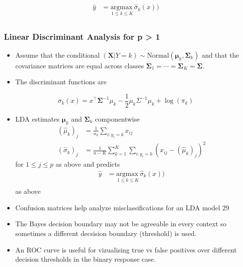 \documentclass[11pt]{article}
\begin{document}
\begin{align*}
\hat{y} &= \underset{1 \leqslant k \leqslant K}{\text{argmax}\ } \hat{\sigma}_k(x)) \\
\end{align*}

    \hypertarget{linear-discriminant-analysis-for-p-1}{%
\subsubsection{Linear Discriminant Analysis for p \textgreater{}
1}\label{linear-discriminant-analysis-for-p-1}}

    \begin{itemize}
\item
  Assume that the conditional
  \((\mathbf{X}| Y = k) \sim \text{Normal}(\boldsymbol{\mu}_k, \boldsymbol{\Sigma}_k)\)
  and that the covariance matrices are equal across classes
  \(\boldsymbol{\Sigma}_1 = \cdots = \boldsymbol{\Sigma}_K = \boldsymbol{\Sigma}\).
\item
  The discriminant functions are
\end{itemize}

\[\sigma_k(x) = x^\top\boldsymbol{\Sigma}^{-1}\mu_k - \frac{1}{2}\mu_k {\Sigma}^{-1} \mu_k + \log(\pi_k)\]

\begin{itemize}
\item
  LDA estimates \(\boldsymbol{\mu}_k\) and \(\boldsymbol{\Sigma}_k\)
  componentwise \begin{align*}
  (\hat{\mu}_k)_j &= \frac{1}{n_k}\sum_{i: y_i = k} x_{ij}\\
  (\hat{\sigma}_k)_j &= \frac{1}{n-K} \sum_{k = 1}^K \sum_{i: y_i = k} \left(x_{ij} - (\hat{\mu}_k)_j\right)^2
  \end{align*} for \(1 \leqslant j \leqslant p\) as above and predicts
  \begin{align*}
  \hat{y} &= \underset{1 \leqslant k \leqslant K}{\text{argmax}\ } \hat{\sigma}_k(x)) \\
  \end{align*} as above
\item
  Confusion matrices help analyze misclassifications for an LDA model 29
\item
  The Bayes decision boundary may not be agreeable in every context so
  sometimes a different decsision boundary (threshold) is used.
\item
  An ROC curve is useful for vizualising true vs false positives over
  different decision thresholds in the binary response case.
\end{itemize}
\end{document}
